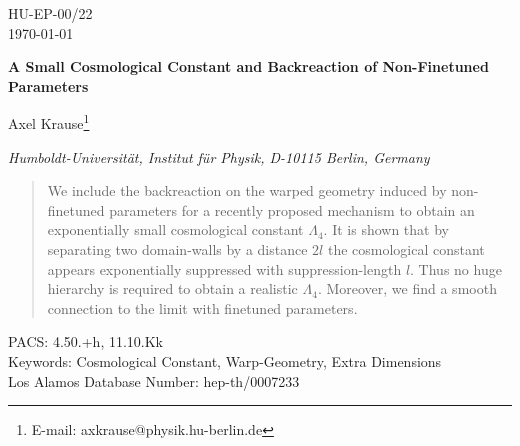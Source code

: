 \documentclass[a4paper,12pt]{article}
\begin{document}
\begin{titlepage}
\begin{flushright}
HU-EP-00/22 \\
\today
\end{flushright}

\vspace{1cm}
\begin{center}
\baselineskip25pt
{\Large\bf A Small Cosmological Constant and Backreaction of
           Non-Finetuned Parameters}
\end{center}
\vspace{1cm}
\begin{center}
\baselineskip12pt
{Axel Krause\footnote{E-mail: axkrause@physik.hu-berlin.de}}
\vspace{.3truecm}
\vspace{1cm}

{\it Humboldt-Universit\"{a}t, Institut f\"{u}r Physik, D-10115 Berlin,
     Germany}

\vspace{0.3cm}
\end{center}
\vspace*{\fill}

\begin{abstract}
We include the backreaction on the warped geometry induced by
non-finetuned parameters for a recently proposed mechanism to obtain
an exponentially small cosmological constant $\Lambda_4$. It is shown
that by separating two domain-walls by a distance $2l$ the
cosmological constant appears exponentially suppressed with
suppression-length $l$. Thus no huge hierarchy is required to obtain a
realistic $\Lambda_4$. Moreover, we find a smooth connection to the
limit with finetuned parameters.
\end{abstract}

\noindent
PACS: 4.50.+h, 11.10.Kk \\
Keywords: Cosmological Constant, Warp-Geometry, Extra Dimensions \\
Los Alamos Database Number: hep-th/0007233

\vspace*{\fill}

\end{titlepage}
\end{document}
